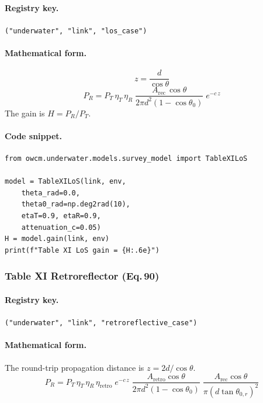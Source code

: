 \documentclass[11pt,a4paper]{article}
\begin{document}
\paragraph{Registry key.} \texttt{("underwater", "link", "los\_case")}

\paragraph{Mathematical form.}
\begin{equation}
z = \frac{d}{\cos\theta}
\end{equation}
\begin{equation}
\boxed{P_R = P_T \,\eta_T\,\eta_R \;
\frac{A_{\text{rec}}\,\cos\theta}{2\pi d^2 (1-\cos\theta_0)}
\; e^{-c\,z}}
\end{equation}
The gain is $H = P_R / P_T$.

\paragraph{Code snippet.}
\begin{lstlisting}
from owcm.underwater.models.survey_model import TableXILoS

model = TableXILoS(link, env,
    theta_rad=0.0,
    theta0_rad=np.deg2rad(10),
    etaT=0.9, etaR=0.9,
    attenuation_c=0.05)
H = model.gain(link, env)
print(f"Table XI LoS gain = {H:.6e}")
\end{lstlisting}

\subsubsection{Table XI Retroreflector (Eq.\,90)}
\label{sec:uw_retro}

\paragraph{Registry key.} \texttt{("underwater", "link", "retroreflective\_case")}

\paragraph{Mathematical form.}
The round-trip propagation distance is $z = 2d/\cos\theta$.
\begin{equation}
\boxed{P_R = P_T\,\eta_T\,\eta_R\,\eta_{\text{retro}}\;
e^{-c\,z}\;
\frac{A_{\text{retro}}\cos\theta}
     {2\pi d^2 (1-\cos\theta_0)}
\;\frac{A_{\text{rec}}\cos\theta}
       {\pi (d\tan\theta_{0,r})^2}}
\end{equation}
\end{document}
